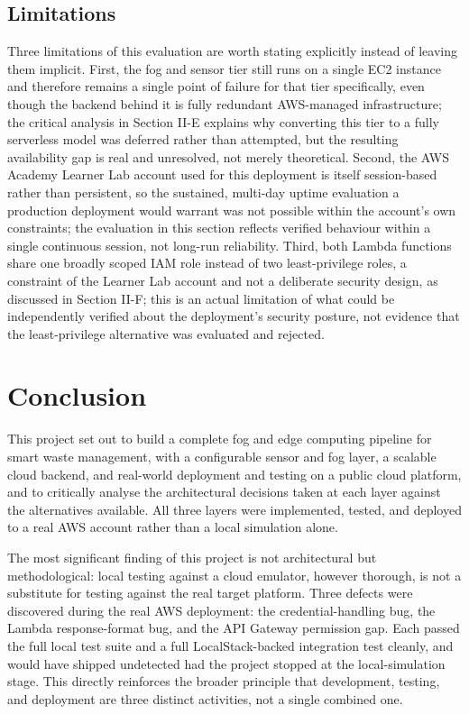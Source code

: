 \documentclass[conference]{IEEEtran}
\begin{document}
\subsection{Limitations}
Three limitations of this evaluation are worth stating explicitly instead of leaving them implicit. First, the fog and sensor tier still runs on a single EC2 instance and therefore remains a single point of failure for that tier specifically, even though the backend behind it is fully redundant AWS-managed infrastructure; the critical analysis in Section II-E explains why converting this tier to a fully serverless model was deferred rather than attempted, but the resulting availability gap is real and unresolved, not merely theoretical. Second, the AWS Academy Learner Lab account used for this deployment is itself session-based rather than persistent, so the sustained, multi-day uptime evaluation a production deployment would warrant was not possible within the account's own constraints; the evaluation in this section reflects verified behaviour within a single continuous session, not long-run reliability. Third, both Lambda functions share one broadly scoped IAM role instead of two least-privilege roles, a constraint of the Learner Lab account and not a deliberate security design, as discussed in Section II-F; this is an actual limitation of what could be independently verified about the deployment's security posture, not evidence that the least-privilege alternative was evaluated and rejected.

\section{Conclusion}
This project set out to build a complete fog and edge computing pipeline for smart waste management, with a configurable sensor and fog layer, a scalable cloud backend, and real-world deployment and testing on a public cloud platform, and to critically analyse the architectural decisions taken at each layer against the alternatives available. All three layers were implemented, tested, and deployed to a real AWS account rather than a local simulation alone.

The most significant finding of this project is not architectural but methodological: local testing against a cloud emulator, however thorough, is not a substitute for testing against the real target platform. Three defects were discovered during the real AWS deployment: the credential-handling bug, the Lambda response-format bug, and the API Gateway permission gap. Each passed the full local test suite and a full LocalStack-backed integration test cleanly, and would have shipped undetected had the project stopped at the local-simulation stage. This directly reinforces the broader principle that development, testing, and deployment are three distinct activities, not a single combined one.
\end{document}
